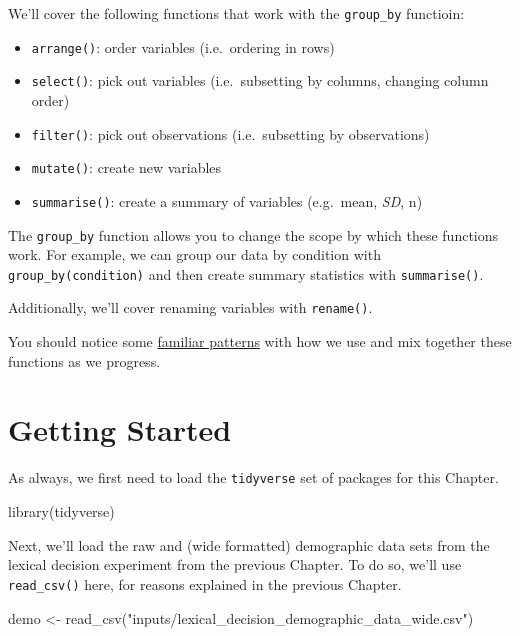 \documentclass[
]{book}
\newenvironment{Shaded}{\begin{snugshade}}{\end{snugshade}}
\newcommand{\FunctionTok}[1]{\textcolor[rgb]{0.00,0.00,0.00}{#1}}
\newcommand{\NormalTok}[1]{#1}
\newcommand{\OtherTok}[1]{\textcolor[rgb]{0.56,0.35,0.01}{#1}}
\newcommand{\StringTok}[1]{\textcolor[rgb]{0.31,0.60,0.02}{#1}}
\providecommand{\tightlist}{%
  \setlength{\itemsep}{0pt}\setlength{\parskip}{0pt}}
\begin{document}
We'll cover the following functions that work with the \texttt{group\_by} functioin:

\begin{itemize}
\tightlist
\item
  \texttt{arrange()}: order variables (i.e.~ordering in rows)
\item
  \texttt{select()}: pick out variables (i.e.~subsetting by columns, changing column order)
\item
  \texttt{filter()}: pick out observations (i.e.~subsetting by observations)
\item
  \texttt{mutate()}: create new variables
\item
  \texttt{summarise()}: create a summary of variables (e.g.~mean, \emph{SD}, n)
\end{itemize}

The \texttt{group\_by} function allows you to change the scope by which these functions work. For example, we can group our data by condition with \texttt{group\_by(condition)} and then create summary statistics with \texttt{summarise()}.

Additionally, we'll cover renaming variables with \texttt{rename()}.

You should notice some \href{https://youtu.be/HMD2lCnWfns?t=45s}{familiar patterns} with how we use and mix together these functions as we progress.

\hypertarget{getting-started-2}{%
\section{Getting Started}\label{getting-started-2}}

As always, we first need to load the \texttt{tidyverse} set of packages for this Chapter.

\begin{Shaded}
\begin{Highlighting}[]
\FunctionTok{library}\NormalTok{(tidyverse)}
\end{Highlighting}
\end{Shaded}

Next, we'll load the raw and (wide formatted) demographic data sets from the lexical decision experiment from the previous Chapter. To do so, we'll use \texttt{read\_csv()} here, for reasons explained in the previous Chapter.

\begin{Shaded}
\begin{Highlighting}[]
\NormalTok{demo }\OtherTok{\textless{}{-}} \FunctionTok{read\_csv}\NormalTok{(}\StringTok{"inputs/lexical\_decision\_demographic\_data\_wide.csv"}\NormalTok{)}
\end{Highlighting}
\end{Shaded}
\end{document}
